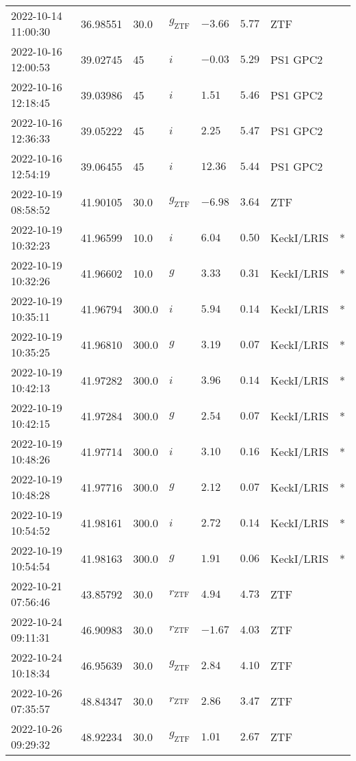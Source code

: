 \documentclass{nature_plusfigure}
\begin{document}
\begin{supplement}
\begin{center}
\begin{longtable}{llllllll}
2022-10-14 11:00:30 & 36.98551 & 30.0 & ${g}_\mathrm{ZTF}$ & $-3.66$ & $5.77$ & ZTF &  \\ 
2022-10-16 12:00:53 & 39.02745 & 45 & $i$ & $-0.03$ & $5.29$ & PS1 GPC2 &  \\ 
2022-10-16 12:18:45 & 39.03986 & 45 & $i$ & $1.51$ & $5.46$ & PS1 GPC2 &  \\ 
2022-10-16 12:36:33 & 39.05222 & 45 & $i$ & $2.25$ & $5.47$ & PS1 GPC2 &  \\ 
2022-10-16 12:54:19 & 39.06455 & 45 & $i$ & $12.36$ & $5.44$ & PS1 GPC2 &  \\ 
2022-10-19 08:58:52 & 41.90105 & 30.0 & ${g}_\mathrm{ZTF}$ & $-6.98$ & $3.64$ & ZTF &  \\ 
2022-10-19 10:32:23 & 41.96599 & 10.0 & $i$ & $6.04$ & $0.50$ & KeckI/LRIS & * \\ 
2022-10-19 10:32:26 & 41.96602 & 10.0 & $g$ & $3.33$ & $0.31$ & KeckI/LRIS & * \\ 
2022-10-19 10:35:11 & 41.96794 & 300.0 & $i$ & $5.94$ & $0.14$ & KeckI/LRIS & * \\ 
2022-10-19 10:35:25 & 41.96810 & 300.0 & $g$ & $3.19$ & $0.07$ & KeckI/LRIS & * \\ 
2022-10-19 10:42:13 & 41.97282 & 300.0 & $i$ & $3.96$ & $0.14$ & KeckI/LRIS & * \\ 
2022-10-19 10:42:15 & 41.97284 & 300.0 & $g$ & $2.54$ & $0.07$ & KeckI/LRIS & * \\ 
2022-10-19 10:48:26 & 41.97714 & 300.0 & $i$ & $3.10$ & $0.16$ & KeckI/LRIS & * \\ 
2022-10-19 10:48:28 & 41.97716 & 300.0 & $g$ & $2.12$ & $0.07$ & KeckI/LRIS & * \\ 
2022-10-19 10:54:52 & 41.98161 & 300.0 & $i$ & $2.72$ & $0.14$ & KeckI/LRIS & * \\ 
2022-10-19 10:54:54 & 41.98163 & 300.0 & $g$ & $1.91$ & $0.06$ & KeckI/LRIS & * \\ 
2022-10-21 07:56:46 & 43.85792 & 30.0 & ${r}_\mathrm{ZTF}$ & $4.94$ & $4.73$ & ZTF &  \\ 
2022-10-24 09:11:31 & 46.90983 & 30.0 & ${r}_\mathrm{ZTF}$ & $-1.67$ & $4.03$ & ZTF &  \\ 
2022-10-24 10:18:34 & 46.95639 & 30.0 & ${g}_\mathrm{ZTF}$ & $2.84$ & $4.10$ & ZTF &  \\ 
2022-10-26 07:35:57 & 48.84347 & 30.0 & ${r}_\mathrm{ZTF}$ & $2.86$ & $3.47$ & ZTF &  \\ 
2022-10-26 09:29:32 & 48.92234 & 30.0 & ${g}_\mathrm{ZTF}$ & $1.01$ & $2.67$ & ZTF &  \\ 

\end{longtable}
\end{center}
\end{supplement}
\end{document}
